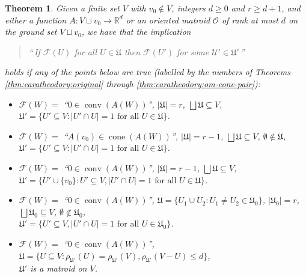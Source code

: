 \documentclass[a4paper,11pt,reqno, english]{amsart}
\newtheorem{theorem}{Theorem}[section]
\theoremstyle{definition}
\theoremstyle{remark}
\newcommand\R{\mathbb R}
\newcommand\U{\mathscr U}
\DeclareMathOperator{\cone}{\mathrm{cone}}
\DeclareMathOperator{\conv}{\mathrm{conv}}
\begin{document}
\begin{theorem}\label{thm:caratheodory:all}
Given a finite set $V$ with $v_0\notin V$, integers $d\geq 0$ and $r\geq d+1$, and either a function $A\colon V\sqcup{v_0}\to\R^d$ or an oriented matroid $\mathscr{O}$ of rank at most $d$ on the ground set $V\sqcup{v_0}$, we have that the implication 
    \begin{quotation}\centering
        ``\,\emph{If $\mathcal{F}(U)$ for all $U\in\mathfrak{U}$ then $\mathcal{F}(U')$ for some $\U'\in\mathfrak{U}'$}\,''
    \end{quotation}
    holds if any of the points below are true (labelled by the numbers of Theorems \ref{thm:caratheodory:original} through \ref{thm:caratheodory:om-cone-pair}):
    \begin{itemize}
        \setlength{\itemsep}{5pt}
        \item[\ref{thm:caratheodory:original}.] 
        $\mathcal{F}(W)=$ ``$0\in\conv(A(W))$'', $|\mathfrak{U}|=r$, $\bigsqcup\mathfrak{U}\subseteq V$, \\ 
        $\mathfrak{U}'=\{U'\subseteq V: |U'\cap U|=1\text{~for all~}U\in\mathfrak{U}\}$.
        
        \item[\ref{thm:caratheodory:cone}.] 
        $\mathcal{F}(W)=$ ``$A(v_0)\in\cone(A(W))$'', $|\mathfrak{U}|=r-1$, $\bigsqcup\mathfrak{U}\subseteq V$, $\emptyset\notin\mathfrak{U}$, \\
        $\mathfrak{U}'=\{U'\subseteq V: |U'\cap U|=1\text{~for all~}U\in\mathfrak{U}\}$. 
        
        \item[\ref{thm:caratheodory:fixed}.]
        $\mathcal{F}(W)=$ ``$0\in\conv(A(W))$'', $|\mathfrak{U}|=r-1$, $\bigsqcup\mathfrak{U}\subseteq V$, \\
        $\mathfrak{U}'=\{U'\cup\{v_0\}:U'\subseteq V,|U'\cap U|=1\text{~for all~}U\in\mathfrak{U}\}$.
        
        \item[\ref{thm:caratheodory:pair}.]
        $\mathcal{F}(W)=$ ``$0\in\conv(A(W))$'', $\mathfrak{U}=\{U_1\cup U_2:U_1\neq U_2\in\mathfrak{U}_0\}$, $|\mathfrak{U}_0|=r$, $\bigsqcup\mathfrak{U}_0\subseteq V$, $\emptyset\notin\mathfrak{U}_0$, \\
        $\mathfrak{U}'=\{U'\subseteq V, |U'\cap U|=1\text{~for all~}U\in\mathfrak{U}_0\}$.
        
        \item[\ref{thm:caratheodory:matroid}.] 
        $\mathcal{F}(W)=$ ``$0\in\conv(A(W))$'', $\mathfrak{U}=\{U\subseteq V:\rho_{\mathfrak{U}'}(U)=\rho_{\mathfrak{U}'}(V),\rho_{\mathfrak{U}'}(V-U)\leq d\}$, \\
        $\mathfrak{U}'$ is a matroid on $V$.
        

\end{itemize}
\end{theorem}
\end{document}

